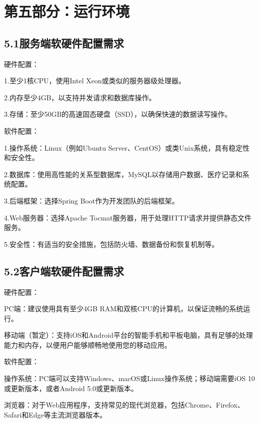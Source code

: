 \documentclass[24pt,a4paper]{article}%
\begin{document}
\section*{\songti 第五部分：运行环境}
\subsection*{\songti 5.1服务端软硬件配置需求}
\noindent 硬件配置：\par
1.至少1核CPU，使用Intel Xeon或类似的服务器级处理器。\par
2.内存至少4GB，以支持并发请求和数据库操作。\par
3.存储：至少50GB的高速固态硬盘（SSD），以确保快速的数据读写操作。\par
\noindent  软件配置：\par
1.操作系统：Linux（例如Ubuntu Server、CentOS）或类Unix系统，具有稳定性和安全性。\par
2.数据库：使用高性能的关系型数据库，MySQL以存储用户数据、医疗记录和系统配置。\par
3.后端框架：选择Spring Boot作为开发团队的后端框架。\par
4.Web服务器：选择Apache Tocmat服务器，用于处理HTTP请求并提供静态文件服务。\par
5.安全性：有适当的安全措施，包括防火墙、数据备份和恢复机制等。
\subsection*{\songti 5.2客户端软硬件配置需求}
\noindent 硬件配置：\par
PC端：建议使用具有至少4GB RAM和双核CPU的计算机，以保证流畅的系统运行。\par
移动端（暂定）：支持iOS和Android平台的智能手机和平板电脑，具有足够的处理能力和内存，以便用户能够顺畅地使用您的移动应用。\par
\noindent 软件配置：\par
操作系统：PC端可以支持Windows、macOS或Linux操作系统；移动端需要iOS 10或更新版本，或者Android 5.0或更新版本。\par
浏览器：对于Web应用程序，支持常见的现代浏览器，包括Chrome、Firefox、Safari和Edge等主流浏览器版本。
\newpage
\end{document}

